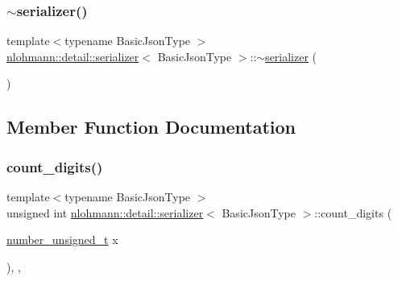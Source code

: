 \mbox{\label{classnlohmann_1_1detail_1_1serializer_aa6c62b51cbebb185307df851dc0167f0}} 
\subsubsection{\texorpdfstring{$\sim$serializer()}{~serializer()}}
{\footnotesize\ttfamily template$<$typename Basic\+Json\+Type $>$ \\
\hyperlink{classnlohmann_1_1detail_1_1serializer}{nlohmann\+::detail\+::serializer}$<$ Basic\+Json\+Type $>$\+::$\sim$\hyperlink{classnlohmann_1_1detail_1_1serializer}{serializer} (\begin{DoxyParamCaption}{ }\end{DoxyParamCaption})\hspace{0.3cm}{\ttfamily [default]}}



\subsection{Member Function Documentation}
\mbox{\label{classnlohmann_1_1detail_1_1serializer_a10692e98ea1f5a64de1d0b8e0e724b99}} 
\subsubsection{\texorpdfstring{count\+\_\+digits()}{count\_digits()}}
{\footnotesize\ttfamily template$<$typename Basic\+Json\+Type $>$ \\
unsigned int \hyperlink{classnlohmann_1_1detail_1_1serializer}{nlohmann\+::detail\+::serializer}$<$ Basic\+Json\+Type $>$\+::count\+\_\+digits (\begin{DoxyParamCaption}\item[{\hyperlink{classnlohmann_1_1detail_1_1serializer_a16c7b7a726a38ff0c06dce7ba7968391}{number\+\_\+unsigned\+\_\+t}}]{x }\end{DoxyParamCaption})\hspace{0.3cm}{\ttfamily [inline]}, {\ttfamily [private]}, {\ttfamily [noexcept]}}



